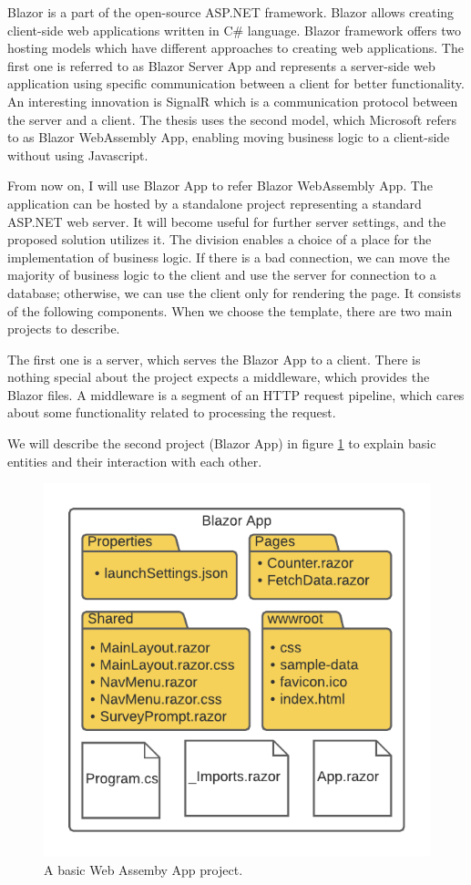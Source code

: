 Blazor is a part of the open-source ASP.NET framework.
Blazor allows creating client-side web applications written in C\# language.
Blazor framework offers two hosting models  which have different approaches to creating web applications. 
The first one is referred to as Blazor Server App and represents a server-side web application using specific communication between a client for better functionality.
An interesting innovation is SignalR which is a communication protocol between the server and a client.
The thesis uses the second model, which Microsoft refers to as Blazor WebAssembly App, enabling moving business logic to a client-side without using Javascript.
\par
From now on, I will use Blazor App to refer Blazor WebAssembly App.
The application can be hosted by a standalone project representing a standard ASP.NET web server.
It will become useful for further server settings, and the proposed solution utilizes it.
The division enables a choice of a place for the implementation of business logic.
If there is a bad connection, we can move the majority of business logic to the client and use the server for connection to a database; otherwise, we can use the client only for rendering the page. It consists of the following components. 
When we choose the template, there are two main projects to describe.
\par
The first one is a server, which serves the Blazor App to a client.
There is nothing special about the project expects a middleware, which provides the Blazor files.
A middleware is a segment of an HTTP request pipeline, which cares about some functionality related to processing the request.
\par
We will describe the second project (Blazor App) in figure \ref{img01:project} to explain basic entities and their interaction with each other.
\par
\begin{figure}[H]\centering
\includegraphics{./img/ProjectStructure}
\caption{A basic Web Assemby App project.}
\label{img01:project}
\end{figure} 
